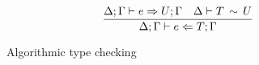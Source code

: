 \begin{figure}[t]
\begin{gather*}
{    }
    \\
    \frac{
      {\Delta;\Gamma} \vdash {e} \Rightarrow {U};{\Gamma}
      \quad
      {\Delta} \vdash T\,\sim\,U
    }{
      {\Delta;\Gamma} \vdash {e}\Leftarrow {T}; {\Gamma}
    }
  \end{gather*}
  \caption{Algorithmic type checking}
  \label{fig:alg-typing}
\end{figure}

